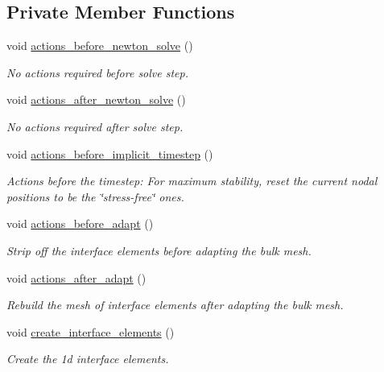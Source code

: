 \subsection*{Private Member Functions}
\begin{DoxyCompactItemize}
\item 
void \hyperlink{classInterfaceProblem_ade63c8a74f666edf530460b989968b4f}{actions\+\_\+before\+\_\+newton\+\_\+solve} ()
\begin{DoxyCompactList}\small\item\em No actions required before solve step. \end{DoxyCompactList}\item 
void \hyperlink{classInterfaceProblem_aedc2e58b3d2f5f8c898a21ba2d245cee}{actions\+\_\+after\+\_\+newton\+\_\+solve} ()
\begin{DoxyCompactList}\small\item\em No actions required after solve step. \end{DoxyCompactList}\item 
void \hyperlink{classInterfaceProblem_ae3ec75fcc8ccca97207dc7eca23b1cce}{actions\+\_\+before\+\_\+implicit\+\_\+timestep} ()
\begin{DoxyCompactList}\small\item\em Actions before the timestep\+: For maximum stability, reset the current nodal positions to be the \char`\"{}stress-\/free\char`\"{} ones. \end{DoxyCompactList}\item 
void \hyperlink{classInterfaceProblem_a944e5754e9b3f3394211b6c62f705abe}{actions\+\_\+before\+\_\+adapt} ()
\begin{DoxyCompactList}\small\item\em Strip off the interface elements before adapting the bulk mesh. \end{DoxyCompactList}\item 
void \hyperlink{classInterfaceProblem_a1c8a5dee970dccc3f1da993cf531872d}{actions\+\_\+after\+\_\+adapt} ()
\begin{DoxyCompactList}\small\item\em Rebuild the mesh of interface elements after adapting the bulk mesh. \end{DoxyCompactList}\item 
void \hyperlink{classInterfaceProblem_a94e2cc71fe27c0c329030874e05734b8}{create\+\_\+interface\+\_\+elements} ()
\begin{DoxyCompactList}\small\item\em Create the 1d interface elements. \end{DoxyCompactList}\item 

\end{DoxyCompactItemize}
